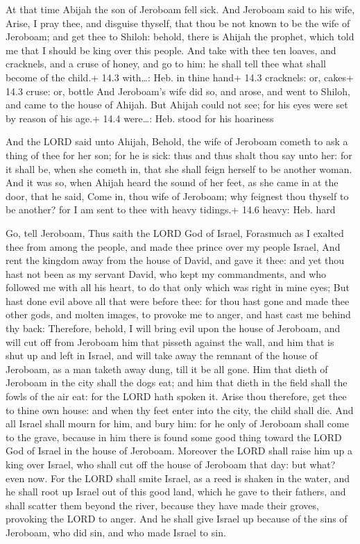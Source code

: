  At that time Abijah the son of Jeroboam fell sick.
 And Jeroboam said to his wife, Arise, I pray thee, and
disguise thyself, that thou be not known to be the wife of Jeroboam; and
get thee to Shiloh: behold, there is Ahijah the prophet, which told me
that I should be king over this people.  And take with thee
ten loaves, and cracknels, and a cruse of honey, and go to him: he shall
tell thee what shall become of the child.+ 14.3 with\ldots: Heb. in
thine hand+ 14.3 cracknels: or, cakes+ 14.3 cruse: or, bottle
 And Jeroboam's wife did so, and arose, and went to Shiloh,
and came to the house of Ahijah. But Ahijah could not see; for his eyes
were set by reason of his age.+ 14.4 were\ldots: Heb. stood for his
hoariness

 And the LORD said unto Ahijah, Behold, the wife of
Jeroboam cometh to ask a thing of thee for her son; for he is sick: thus
and thus shalt thou say unto her: for it shall be, when she cometh in,
that she shall feign herself to be another woman.  And it
was so, when Ahijah heard the sound of her feet, as she came in at the
door, that he said, Come in, thou wife of Jeroboam; why feignest thou
thyself to be another? for I am sent to thee with heavy tidings.+ 14.6
heavy: Heb. hard

 Go, tell Jeroboam, Thus saith the LORD God of Israel,
Forasmuch as I exalted thee from among the people, and made thee prince
over my people Israel,  And rent the kingdom away from the
house of David, and gave it thee: and yet thou hast not been as my
servant David, who kept my commandments, and who followed me with all
his heart, to do that only which was right in mine eyes; 
But hast done evil above all that were before thee: for thou hast gone
and made thee other gods, and molten images, to provoke me to anger, and
hast cast me behind thy back:  Therefore, behold, I will
bring evil upon the house of Jeroboam, and will cut off from Jeroboam
him that pisseth against the wall, and him that is shut up and left in
Israel, and will take away the remnant of the house of Jeroboam, as a
man taketh away dung, till it be all gone.  Him that dieth
of Jeroboam in the city shall the dogs eat; and him that dieth in the
field shall the fowls of the air eat: for the LORD hath spoken it.
 Arise thou therefore, get thee to thine own house: and
when thy feet enter into the city, the child shall die. 
And all Israel shall mourn for him, and bury him: for he only of
Jeroboam shall come to the grave, because in him there is found some
good thing toward the LORD God of Israel in the house of Jeroboam.
 Moreover the LORD shall raise him up a king over Israel,
who shall cut off the house of Jeroboam that day: but what? even now.
 For the LORD shall smite Israel, as a reed is shaken in
the water, and he shall root up Israel out of this good land, which he
gave to their fathers, and shall scatter them beyond the river, because
they have made their groves, provoking the LORD to anger. 
And he shall give Israel up because of the sins of Jeroboam, who did
sin, and who made Israel to sin.


